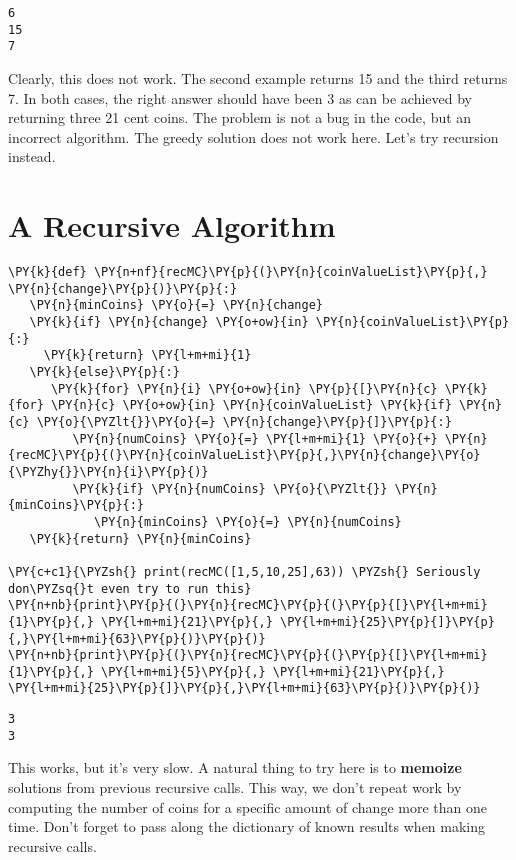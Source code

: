 \begin{Verbatim}
6
15
7

\end{Verbatim}


Clearly, this does not work.
The second example returns 15 and the third returns 7.
In both cases, the right answer should have been 3 as can be achieved by returning three 21 cent coins.
The problem is not a bug in the code, but an incorrect algorithm.
The greedy solution does not work here.
Let's try recursion instead.

\section{A Recursive Algorithm}


\begin{Verbatim}[commandchars=\\\{\}]
\PY{k}{def} \PY{n+nf}{recMC}\PY{p}{(}\PY{n}{coinValueList}\PY{p}{,} \PY{n}{change}\PY{p}{)}\PY{p}{:}
   \PY{n}{minCoins} \PY{o}{=} \PY{n}{change}
   \PY{k}{if} \PY{n}{change} \PY{o+ow}{in} \PY{n}{coinValueList}\PY{p}{:}
     \PY{k}{return} \PY{l+m+mi}{1}
   \PY{k}{else}\PY{p}{:}
      \PY{k}{for} \PY{n}{i} \PY{o+ow}{in} \PY{p}{[}\PY{n}{c} \PY{k}{for} \PY{n}{c} \PY{o+ow}{in} \PY{n}{coinValueList} \PY{k}{if} \PY{n}{c} \PY{o}{\PYZlt{}}\PY{o}{=} \PY{n}{change}\PY{p}{]}\PY{p}{:}
         \PY{n}{numCoins} \PY{o}{=} \PY{l+m+mi}{1} \PY{o}{+} \PY{n}{recMC}\PY{p}{(}\PY{n}{coinValueList}\PY{p}{,}\PY{n}{change}\PY{o}{\PYZhy{}}\PY{n}{i}\PY{p}{)}
         \PY{k}{if} \PY{n}{numCoins} \PY{o}{\PYZlt{}} \PY{n}{minCoins}\PY{p}{:}
            \PY{n}{minCoins} \PY{o}{=} \PY{n}{numCoins}
   \PY{k}{return} \PY{n}{minCoins}

\PY{c+c1}{\PYZsh{} print(recMC([1,5,10,25],63)) \PYZsh{} Seriously don\PYZsq{}t even try to run this}
\PY{n+nb}{print}\PY{p}{(}\PY{n}{recMC}\PY{p}{(}\PY{p}{[}\PY{l+m+mi}{1}\PY{p}{,} \PY{l+m+mi}{21}\PY{p}{,} \PY{l+m+mi}{25}\PY{p}{]}\PY{p}{,}\PY{l+m+mi}{63}\PY{p}{)}\PY{p}{)}
\PY{n+nb}{print}\PY{p}{(}\PY{n}{recMC}\PY{p}{(}\PY{p}{[}\PY{l+m+mi}{1}\PY{p}{,} \PY{l+m+mi}{5}\PY{p}{,} \PY{l+m+mi}{21}\PY{p}{,} \PY{l+m+mi}{25}\PY{p}{]}\PY{p}{,}\PY{l+m+mi}{63}\PY{p}{)}\PY{p}{)}
\end{Verbatim}

\begin{Verbatim}
3
3

\end{Verbatim}


This works, but it's very slow.  A natural thing to try here is to \textbf{memoize} solutions from previous recursive calls.
This way, we don't repeat work by computing the number of coins for a specific amount of change more than one time.
Don't forget to pass along the dictionary of known results when making recursive calls.

